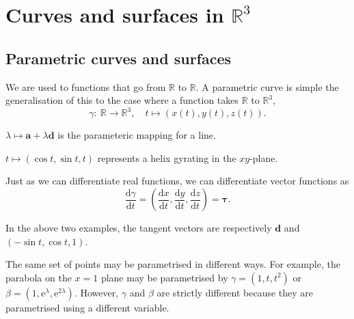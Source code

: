 \documentclass[letter-paper]{tufte-book}
\newenvironment{example}[1][Example]{\begin{trivlist}
\item[\hskip \labelsep {\bfseries #1}]}{\end{trivlist}}
\newcommand{\ab}{\boldsymbol{a}}
\newcommand{\db}{\boldsymbol{d}}
\newcommand{\ex}{\mathrm{e}}
\begin{document}

\chapter{Curves and surfaces in $\mathbb{R}^3$}

\section{Parametric curves and surfaces}

We are used to functions that go from $\mathbb{R}$ to $\mathbb{R}$. A parametric
curve is simple the generalisation of this to the case where a function takes
$\mathbb{R}$ to $\mathbb{R}^3$,
\begin{equation*}
	\gamma:\ \mathbb{R}\rightarrow\mathbb{R}^3,\quad
	t\mapsto(x(t),y(t),z(t)).
\end{equation*}
\begin{example}
	$\lambda\mapsto\ab+\lambda\db$ is the parameteric mapping for a line.
\end{example}
\begin{example}
	$t\mapsto(\cos t,\sin t, t)$ represents a helix gyrating in the $xy$-plane.
\end{example}

Just as we can differentiate real functions, we can differentiate vector
functions as
\begin{equation*}
	\frac{\mathrm{d}\gamma}{\mathrm{d}t}=\left(
	\frac{\mathrm{d}x}{\mathrm{d}t}, \frac{\mathrm{d}y}{\mathrm{d}t},
	\frac{\mathrm{d}z}{\mathrm{d}t}\right)=\boldsymbol{\tau}.
\end{equation*}
\begin{example}
	In the above two examples, the tangent vectors are respectively $\db$ and
	$(-\sin t, \cos t,1)$.
\end{example}

The same set of points may be parametrised in different ways. For example, the
parabola on the $x=1$ plane may be parametrised by $\gamma=(1,t,t^2)$ or
$\beta=(1,\ex^\lambda,\ex^{2\lambda})$. However, $\gamma$ and $\beta$ are
strictly different because they are parametrised using a different variable.
\end{document}
